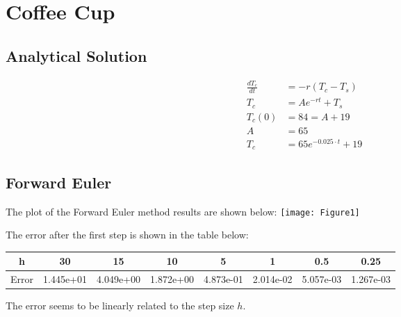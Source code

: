 \documentclass{article}
\begin{document}
\section{Coffee Cup}

\subsection{Analytical Solution}
\begin{align*}
	\frac{dT_c}{dt} &= -r(T_c-T_s)\\
	T_c &= Ae^{-rt} + T_s\\
	T_c(0) &= 84 = A+19\\
	A &= 65\\
	T_c &= 65 e^{-0.025 \cdot t} + 19
\end{align*}

\subsection{Forward Euler}

The plot of the Forward Euler method results are shown below:
\texttt{[image: Figure1]}


The error after the first step is shown in the table below:

\begin{center}
\begin{tabular}{c|c|c|c|c|c|c|c}
 h &  30& 15& 10& 5& 1& 0.5& 0.25\\ \hline
Error &  1.445e+01& 4.049e+00& 1.872e+00& 4.873e-01& 2.014e-02& 5.057e-03& 1.267e-03
\end{tabular}
\end{center}

The error seems to be linearly related to the step size $h$.
\end{document}
